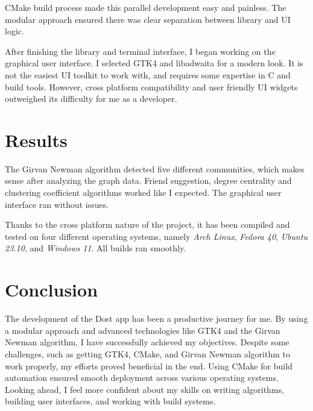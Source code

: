 \documentclass[11pt, twocolumn]{article}
\begin{document}
CMake build process made this parallel development easy and painless. The modular approach ensured there was clear separation 
between library and UI logic. 

After finishing the library and terminal interface, I began working on the graphical user interface. I selected GTK4 and libadwaita
for a modern look. It is not the easiest UI toolkit to work with, and requires some expertise in C and build tools. However, cross
platform compatibility and user friendly UI widgets outweighed its difficulty for me as a developer.

\section{Results}
The Girvan Newman algorithm detected five different communities, which makes sense after analyzing the graph data. Friend suggestion,
degree centrality and clustering coefficient algorithms worked like I expected. The graphical user interface ran without issues.

Thanks to the cross platform nature of the project, it has been compiled and tested on four different operating systems, 
namely \textit{Arch Linux}, \textit{Fedora 40}, \textit{Ubuntu 23.10}, and \textit{Windows 11}. All builds ran smoothly.

\section{Conclusion}
The development of the Dost app has been a productive journey for me. By using a modular approach and 
advanced technologies like GTK4 and the Girvan Newman algorithm, I have successfully achieved my objectives.
Despite some challenges, such as getting GTK4, CMake, and Girvan Newman algorithm to work properly, my efforts proved beneficial in the end. 
Using CMake for build automation ensured smooth deployment across various operating systems. Looking ahead, 
I feel more confident about my skills on writing algorithms, building user interfaces, and working with build systems.

\newpage
\end{document}
